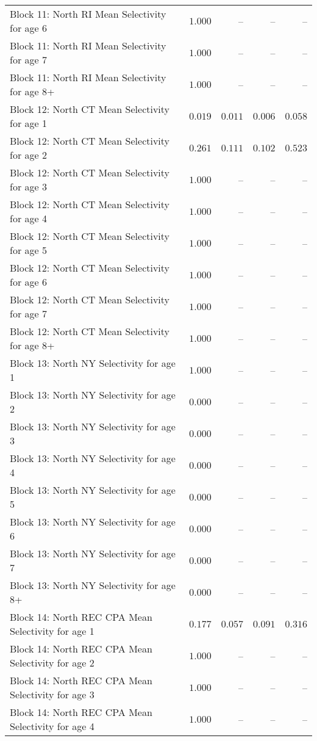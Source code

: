\documentclass[
]{article}
\begin{document}
\begin{landscape}
\begin{longtable}[t]{lrrrr}
Block 11: North RI Mean Selectivity for age 6 & $1.000$ & -- & -- & --\\
Block 11: North RI Mean Selectivity for age 7 & $1.000$ & -- & -- & --\\
Block 11: North RI Mean Selectivity for age 8+ & $1.000$ & -- & -- & --\\
\addlinespace
Block 12: North CT Mean Selectivity for age 1 & $0.019$ & $0.011$ & $0.006$ & $0.058$\\
Block 12: North CT Mean Selectivity for age 2 & $0.261$ & $0.111$ & $0.102$ & $0.523$\\
Block 12: North CT Mean Selectivity for age 3 & $1.000$ & -- & -- & --\\
Block 12: North CT Mean Selectivity for age 4 & $1.000$ & -- & -- & --\\
Block 12: North CT Mean Selectivity for age 5 & $1.000$ & -- & -- & --\\
\addlinespace
Block 12: North CT Mean Selectivity for age 6 & $1.000$ & -- & -- & --\\
Block 12: North CT Mean Selectivity for age 7 & $1.000$ & -- & -- & --\\
Block 12: North CT Mean Selectivity for age 8+ & $1.000$ & -- & -- & --\\
Block 13: North NY Selectivity for age 1 & $1.000$ & -- & -- & --\\
Block 13: North NY Selectivity for age 2 & $0.000$ & -- & -- & --\\
\addlinespace
Block 13: North NY Selectivity for age 3 & $0.000$ & -- & -- & --\\
Block 13: North NY Selectivity for age 4 & $0.000$ & -- & -- & --\\
Block 13: North NY Selectivity for age 5 & $0.000$ & -- & -- & --\\
Block 13: North NY Selectivity for age 6 & $0.000$ & -- & -- & --\\
Block 13: North NY Selectivity for age 7 & $0.000$ & -- & -- & --\\
\addlinespace
Block 13: North NY Selectivity for age 8+ & $0.000$ & -- & -- & --\\
Block 14: North REC CPA Mean Selectivity for age 1 & $0.177$ & $0.057$ & $0.091$ & $0.316$\\
Block 14: North REC CPA Mean Selectivity for age 2 & $1.000$ & -- & -- & --\\
Block 14: North REC CPA Mean Selectivity for age 3 & $1.000$ & -- & -- & --\\
Block 14: North REC CPA Mean Selectivity for age 4 & $1.000$ & -- & -- & --\\

\end{longtable}
\end{landscape}
\end{document}
